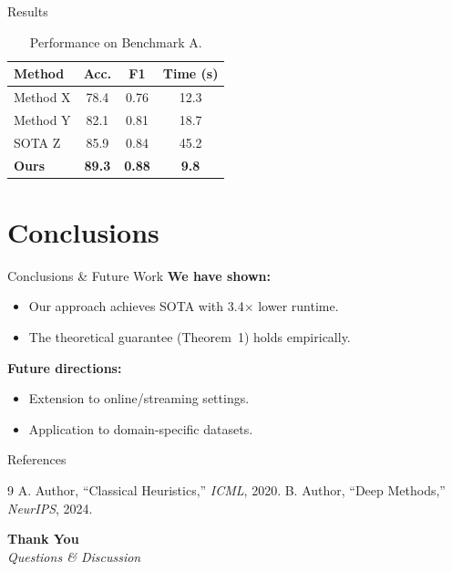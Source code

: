 \documentclass[aspectratio=169]{beamer}
\begin{document}
\begin{frame}{Results}
  \begin{table}
    \centering
    \begin{tabular}{lccc}
      \toprule
      \textbf{Method} & \textbf{Acc.} & \textbf{F1} & \textbf{Time (s)} \\
      \midrule
      Method X        & 78.4          & 0.76        & 12.3              \\
      Method Y        & 82.1          & 0.81        & 18.7              \\
      SOTA Z          & 85.9          & 0.84        & 45.2              \\
      \textbf{Ours}   & \textbf{89.3} & \textbf{0.88} & \textbf{9.8}  \\
      \bottomrule
    \end{tabular}
    \caption{Performance on Benchmark A.}
  \end{table}
\end{frame}

\section{Conclusions}

\begin{frame}{Conclusions \& Future Work}
  \textbf{We have shown:}
  \begin{itemize}
    \item Our approach achieves SOTA with 3.4$\times$ lower runtime.
    \item The theoretical guarantee (Theorem~1) holds empirically.
  \end{itemize}

  \vspace{0.8em}
  \textbf{Future directions:}
  \begin{itemize}
    \item Extension to online/streaming settings.
    \item Application to domain-specific datasets.
  \end{itemize}
\end{frame}

\begin{frame}{References}
  \small
  \begin{thebibliography}{9}
     A. Author, ``Classical Heuristics,'' \textit{ICML}, 2020.
     B. Author, ``Deep Methods,'' \textit{NeurIPS}, 2024.
  \end{thebibliography}
\end{frame}

\begin{frame}[plain]
  \centering
  \vfill
  {\Huge\bfseries Thank You} \\[1em]
  {\large\itshape Questions \& Discussion}
  \vfill
\end{frame}
\end{document}
